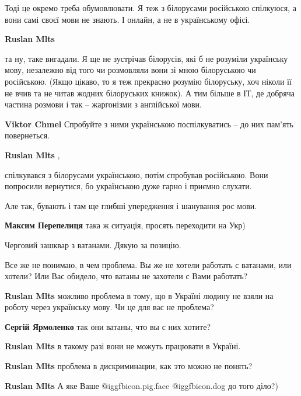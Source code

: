 \begin{itemize}
\begin{itemize}
Тоді це окремо треба обумовлювати. Я теж з білорусами російською спілкуюся, а
вони самі своєї мови не знають. І онлайн, а не в українському офісі.

\textbf{Ruslan Mlts} 

та ну, таке вигадали. Я ще не зустрічав білорусів, які б не розуміли українську
мову, незалежно від того чи розмовляли вони зі мною білоруською чи російською.
(Якщо цікаво, то я теж прекрасно розумію білоруську, хоч ніколи її не вчив та
не читав жодних білоруських книжок). А тим більше в ІТ, де добряча частина
розмови і так – жаргонізми з англійської мови.

\textbf{Viktor Chmel} Спробуйте з ними українською поспілкуватись – до них пам'ять повернеться.

\textbf{Ruslan Mlts} , 

спілкувався з білорусами українською, потім спробував російською. Вони
попросили вернутися, бо українською дуже гарно і приємно слухати.

Але так, бувають і там ще глибші упередження і шанування рос мови.

\textbf{Максим Перепелиця} така ж ситуація, просять переходити на Укр)
\end{itemize} %

Черговий зашквар з ватанами. Дякую за позицію.


Все же не понимаю, в чем проблема. Вы же не хотели работать с ватанами, или
хотели? Или Вас обидело, что ватаны не захотели с Вами работать?

\begin{itemize} %
\textbf{Ruslan Mlts} можливо проблема в тому, що в Україні людину не взяли на роботу через українську мову. Чи це для вас не проблема?

\textbf{Сергій Ярмоленко} так они ватаны, что вы с них хотите?

\textbf{Ruslan Mlts} в такому разі вони не можуть працювати в Україні.

\textbf{Ruslan Mlts} проблема в дискриминации, как это можно не понять?

\textbf{Ruslan Mlts}
А яке Ваше  @igg{fbicon.pig.face}  @igg{fbicon.dog}  до того діло?)
\end{itemize} %


\end{itemize}
